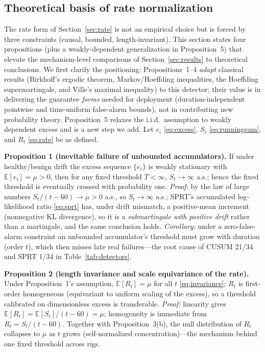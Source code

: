 \documentclass[journal]{IEEEtran}
\newcommand{\E}{\mathbb{E}}
\begin{document}
\subsection{Theoretical basis of rate normalization}\label{sec:theory}
The rate form of Section~\ref{sec:rate} is not an empirical choice but is forced by three constraints (causal, bounded, length-invariant). This section states four propositions (plus a weakly-dependent generalization in Proposition~5) that elevate the mechanism-level comparisons of Section~\ref{sec:results} to theoretical conclusions. We first clarify the positioning: Propositions~1--4 \emph{adapt} classical results (Birkhoff's ergodic theorem, Markov/Hoeffding inequalities, the Hoeffding supermartingale, and Ville's maximal inequality) to this detector; their value is in delivering the guarantee \emph{forms} needed for deployment (duration-independent pointwise and time-uniform false-alarm bounds), not in contributing new probability theory. Proposition~5 relaxes the i.i.d.\ assumption to weakly dependent excess and is a new step we add. Let $e_i$ \eqref{eq:excess}, $S_t$ \eqref{eq:runningsum}, and $R_t$ \eqref{eq:rate} be as defined.

\textbf{Proposition 1 (inevitable failure of unbounded accumulators).} If under healthy/benign drift the excess sequence $\{e_i\}$ is weakly stationary with $\E[e_i]=\mu>0$, then for any fixed threshold $T<\infty$, $S_t\to\infty$ a.s.; hence the fixed threshold is eventually crossed with probability one. \emph{Proof:} by the law of large numbers $S_t/(t-60)\to\mu>0$ a.s., so $S_t\to\infty$ a.s.; SPRT's accumulated log-likelihood ratio \eqref{eq:sprt} has, under drift mismatch, a positive-mean increment (nonnegative KL divergence), so it is a \emph{submartingale with positive drift} rather than a martingale, and the same conclusion holds. \emph{Corollary:} under a zero-false-alarm constraint an unbounded accumulator's threshold must grow with duration (order $t$), which then misses late real failures---the root cause of CUSUM 21/34 and SPRT 1/34 in Table~\ref{tab:detectors}.

\textbf{Proposition 2 (length invariance and scale equivariance of the rate).} Under Proposition~1's assumption, $\E[R_t]=\mu$ for all $t$ \eqref{eq:invariance}; $R_t$ is first-order homogeneous (equivariant to uniform scaling of the excess), so a threshold calibrated on dimensionless excess is transferable. \emph{Proof:} linearity gives $\E[R_t]=\E[S_t]/(t-60)=\mu$; homogeneity is immediate from $R_t=S_t/(t-60)$. Together with Proposition~3(b), the null distribution of $R_t$ collapses to $\mu$ as $t$ grows (self-normalized concentration)---the mechanism behind one fixed threshold across rigs.
\end{document}
